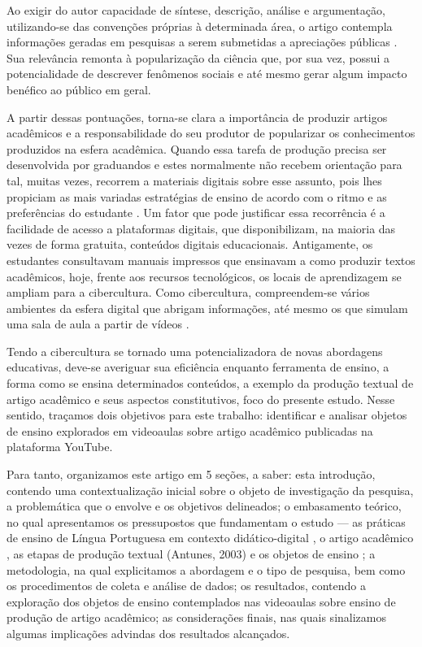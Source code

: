 Ao exigir do autor capacidade de síntese, descrição, análise e
argumentação, utilizando-se das convenções próprias à determinada área,
o artigo contempla informações geradas em pesquisas a serem submetidas a
apreciações públicas \cite{motta-roth2010}. Sua relevância remonta
à popularização da ciência que, por sua vez, possui a potencialidade de
descrever fenômenos sociais e até mesmo gerar algum impacto benéfico ao
público em geral.

A partir dessas pontuações, torna-se clara a importância de produzir
artigos acadêmicos e a responsabilidade do seu produtor de popularizar
os conhecimentos produzidos na esfera acadêmica. Quando essa tarefa de
produção precisa ser desenvolvida por graduandos e estes normalmente não
recebem orientação para tal, muitas vezes, recorrem a materiais digitais
sobre esse assunto, pois lhes propiciam as mais variadas estratégias de
ensino de acordo com o ritmo e as preferências do estudante \cite{falkembach2005}. Um fator que pode justificar essa recorrência é a facilidade de
acesso a plataformas digitais, que disponibilizam, na maioria das vezes
de forma gratuita, conteúdos digitais educacionais. Antigamente, os
estudantes consultavam manuais impressos que ensinavam a como produzir
textos acadêmicos, hoje, frente aos recursos tecnológicos, os locais de
aprendizagem se ampliam para a cibercultura. Como cibercultura,
compreendem-se vários ambientes da esfera digital que abrigam
informações, até mesmo os que simulam uma sala de aula a partir de
vídeos \cite{martins2018,rocha2005}.

Tendo a cibercultura se tornado uma potencializadora de novas abordagens
educativas, deve-se averiguar sua eficiência enquanto ferramenta de
ensino, a forma como se ensina determinados conteúdos, a exemplo da
produção textual de artigo acadêmico e seus aspectos constitutivos, foco
do presente estudo. Nesse sentido, traçamos dois objetivos para este
trabalho: identificar e analisar objetos de ensino explorados em
videoaulas sobre artigo acadêmico publicadas na plataforma YouTube.

Para tanto, organizamos este artigo em 5 seções, a saber: esta
introdução, contendo uma contextualização inicial sobre o objeto de
investigação da pesquisa, a problemática que o envolve e os objetivos
delineados; o embasamento teórico, no qual apresentamos os pressupostos
que fundamentam o estudo --- as práticas de ensino de Língua Portuguesa
em contexto didático-digital \cite{laurentino2023}, o artigo
acadêmico \cite{motta-roth2010}, as etapas de produção textual
(Antunes, 2003) e os objetos de ensino \cite{linodearaujo2014}; a
metodologia, na qual explicitamos a abordagem e o tipo de pesquisa, bem
como os procedimentos de coleta e análise de dados; os resultados,
contendo a exploração dos objetos de ensino contemplados nas videoaulas
sobre ensino de produção de artigo acadêmico; as considerações finais,
nas quais sinalizamos algumas implicações advindas dos resultados
alcançados.